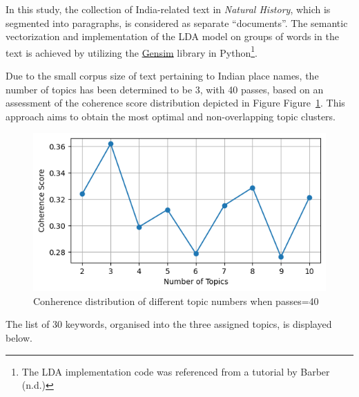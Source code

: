 \documentclass[
  12pt,
]{article}
\begin{document}
In this study, the collection of India-related text in \emph{Natural
History}, which is segmented into paragraphs, is considered as separate
``documents''. The semantic vectorization and implementation of the LDA
model on groups of words in the text is achieved by utilizing the
\href{https://radimrehurek.com/gensim/}{Gensim} library in
Python\footnote{The LDA implementation code was referenced from a
  tutorial by Barber (n.d.)}.

Due to the small corpus size of text pertaining to Indian place names,
the number of topics has been determined to be 3, with 40 passes, based
on an assessment of the coherence score distribution depicted in Figure
Figure~\ref{fig-topic_coherence_distribution}. This approach aims to
obtain the most optimal and non-overlapping topic clusters.

\begin{figure}

{\centering \includegraphics{NHthesis_structure_files/figure-pdf/fig-topic_coherence_distribution-output-1.png}

}

\caption{\label{fig-topic_coherence_distribution}Conherence distribution
of different topic numbers when passes=40}

\end{figure}

The list of 30 keywords, organised into the three assigned topics, is
displayed below.
\end{document}
